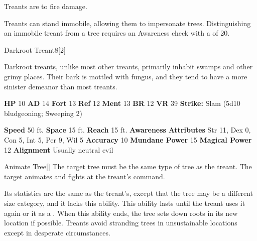         Treants are  to fire damage.
      
        Treants can stand immobile, allowing them to impersonate trees.
        Distinguishing an immobile treant from a tree requires an Awareness check with a  of 20.
  

  \begin{monsubsection}{Darkroot Treant}{8}[2]
    \vspace{-1em}\vspace{-1em}
    \vspace{0em}

    
          Darkroot treants, unlike most other treants, primarily inhabit swamps and other grimy places.
          Their bark is mottled with fungus, and they tend to have a more sinister demeanor than most treants.
        

    \begin{spellcontent}
      \begin{spelltargetinginfo}
        \pari \textbf{HP} 10 \monsep
          \textbf{AD} 14 \monsep
          \textbf{Fort} 13 \monsep
          \textbf{Ref} 12 \monsep
          \textbf{Ment} 13
        \pari \textbf{BR} 12 \monsep
        \textbf{VR} 39
        \pari \textbf{Strike:}
            Slam  (5d10 bludgeoning; Sweeping 2)
      \end{spelltargetinginfo}
    \end{spellcontent}
    \begin{monsterfooter}
      \pari \textbf{Speed} 50 ft. \monsep
        \textbf{Space} 15 ft. \monsep
        \textbf{Reach} 15 ft.
      \pari \textbf{Awareness} 
      \pari \textbf{Attributes}
        Str 11, Dex 0,
        Con 5, Int 5,
        Per 9, Wil 5
      \pari \textbf{Accuracy} 10 \monsep
        \textbf{Mundane Power} 15 \monsep
      \textbf{Magical Power} 12
      \pari \textbf{Alignment} Usually neutral evil
    \end{monsterfooter}
  \end{monsubsection}
  \begin{freeability}{Animate Tree}[]
      The target tree must be the same type of tree as the treant.
        The target animates and fights at the treant's command.

        Its statistics are the same as the treant's, except that the tree may be a different size category, and it lacks this ability.
        This ability lasts until the treant uses it again or  it as a .
        When this ability ends, the tree sets down roots in its new location if possible.
        Treants avoid stranding trees in unsustainable locations except in desperate circumstances.
    \end{freeability}
  
